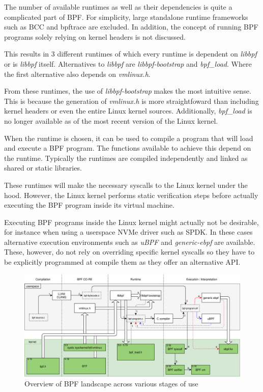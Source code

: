 \documentclass[conference]{IEEEtran}
\begin{document}
The number of available runtimes as well as their dependencies is quite a
complicated part of BPF. For simplicity, large standalone runtime frameworks
such as BCC and bpftrace are excluded. In addition, the concept of running BPF
programs solely relying on kernel headers is not discussed.

This results in 3 different runtimes of which every runtime is dependent on
\textit{libbpf} or is \textit{libbpf} itself. Alternatives to \textit{libbpf}
are \textit{libbpf-bootstrap} and \textit{bpf\_load}. Where the first
alternative also depends on \textit{vmlinux.h}.

From these runtimes, the use of \textit{libbpf-bootstrap} makes the most
intuitive sense. This is because the generation of \textit{vmlinux.h} is more
straightfoward than including kernel headers or even the entire Linux kernel
sources. Additionally, \textit{bpf\_load} is no longer available as of the most
recent version of the Linux kernel.

When the runtime is chosen, it can be used to compile a program that will load
and execute a BPF program. The functions available to achieve this depend on
the runtime. Typically the runtimes are compiled independently and linked as
shared or static libraries.

These runtimes will make the necessary syscalls to the Linux kernel under the
hood. However, the Linux kernel performs static verification steps before
actually executing the BPF program inside its virtual machine.

Executing BPF programs inside the Linux kernel might actually not be desirable,
for instance when using a userspace NVMe driver such as SPDK. In these cases
alternative execution environments such as \textit{uBPF} and
\textit{generic-ebpf} are available. These, however, do not rely on overriding
specific kernel syscalls so they have to be explicitly programmed at compile
them as they offer an alternative API.

\onecolumn

\begin{center}
	\begin{figure}[H]
		\includegraphics[width=1\textwidth]{resources/images/bpf-landscape.png}
		\captionsetup{justification=centering}
		\caption{Overview of BPF landscape across various stages of use}
		\label{fig:bpf-landscape}
	\end{figure}
\end{center}
\end{document}
